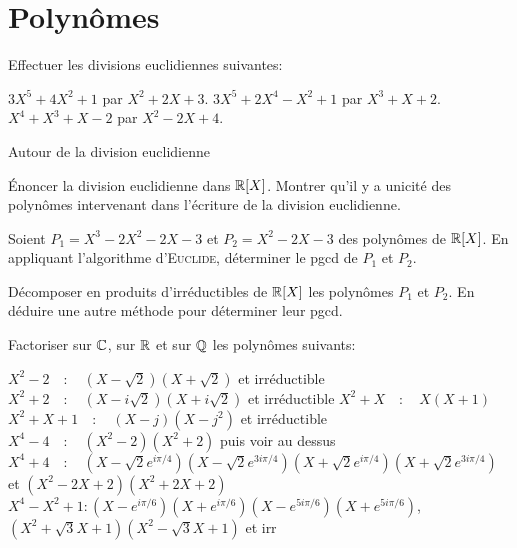 \documentclass[french]{report}
\begin{document}
\section*{Polynômes}

\begin{exo}
    Effectuer les divisions euclidiennes suivantes:
    \begin{enumerate}
        \itt \(3X^5+4X^2+1\) par \(X^2+2X+3\).
        \itt \(3X^5+2X^4-X^2+1\) par \(X^3+X+2\).
        \itt \(X^4+X^3+X-2\) par \(X^2-2X+4\).
    \end{enumerate}
\end{exo}

\begin{exo} Autour de la division euclidienne
    \begin{q}{1}
        Énoncer la division euclidienne dans \(\mathbb{R}[X]\). Montrer qu'il y a unicité des
        polynômes intervenant dans l'écriture de la division euclidienne.
    \end{q}
    \begin{q}{2}
        Soient \(P_1=X^3-2X^2-2X-3\) et \(P_2=X^2-2X-3\) des polynômes de \(\mathbb{R}[X]\).
        En appliquant l'algorithme d'\textsc{Euclide}, déterminer le pgcd de \(P_1\)
        et \(P_2\).
    \end{q}
    \begin{q}{3}
        Décomposer en produits d'irréductibles de \(\mathbb{R}[X]\) les polynômes
        \(P_1\) et \(P_2\). En déduire une autre méthode pour déterminer leur pgcd.
    \end{q}
\end{exo}

\begin{exo}
    Factoriser sur \(\mathbb{C}\), sur \(\mathbb{R}\)  et sur \(\mathbb{Q}\) les polynômes suivants:
    \begin{enumerate}
        \itt \(X^2-2\quad\colon\quad(X-\sqrt{2})(X+\sqrt{2})\) et irréductible
        \itt \(X^2+2\quad\colon\quad(X-i\sqrt{2})(X+i\sqrt{2})\) et irréductible
        \itt \(X^2+X\quad\colon\quad X(X+1)\)
        \itt \(X^2+X+1\quad\colon\quad(X-j)(X-j^2)\) et irréductible
        \itt \(X^4-4\quad\colon\quad(X^2-2)(X^2+2)\) puis voir au dessus
        \itt \(X^4+4\quad\colon\quad(X-\sqrt{2}e^{i\pi/4})(X-\sqrt{2}e^{3i\pi/4})
        (X+\sqrt{2}e^{i\pi/4})(X+\sqrt{2}e^{3i\pi/4})\) et \((X^2-2X+2)(X^2+2X+2)\)
        \itt \(X^4-X^2+1\colon(X-e^{i\pi/6})(X+e^{i\pi/6})(X-e^{5i\pi/6})
        (X+e^{5i\pi/6})\),\((X^2+\sqrt{3}X+1)(X^2-\sqrt{3}X+1)\) et irr
    \end{enumerate}
\end{exo}
\end{document}
